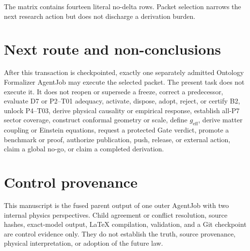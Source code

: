 \documentclass[11pt]{article}
\begin{document}
The matrix contains fourteen literal no-delta rows.  Packet selection narrows
the next research action but does not discharge a derivation burden.

\section{Next route and non-conclusions}

After this transaction is checkpointed, exactly one separately admitted
Ontology Formalizer AgentJob may execute the selected packet.  The present
task does not execute it.  It does not reopen or supersede a freeze, correct a
predecessor, evaluate D7 or P2--T01 adequacy, activate, dispose, adopt, reject,
or certify B2, unlock P4--T03, derive physical causality or empirical response,
establish all-P7 sector coverage, construct conformal geometry or scale,
define $g_{\mathrm{eff}}$, derive matter coupling or Einstein equations,
request a protected Gate verdict, promote a benchmark or proof, authorize
publication, push, release, or external action, claim a global no-go, or claim
a completed derivation.

\section*{Control provenance}

This manuscript is the fused parent output of one outer AgentJob with two
internal physics perspectives.  Child agreement or conflict resolution,
source hashes, exact-model output, LaTeX compilation, validation, and a Git
checkpoint are control evidence only.  They do not establish the truth,
source provenance, physical interpretation, or adoption of the future law.
\end{document}
